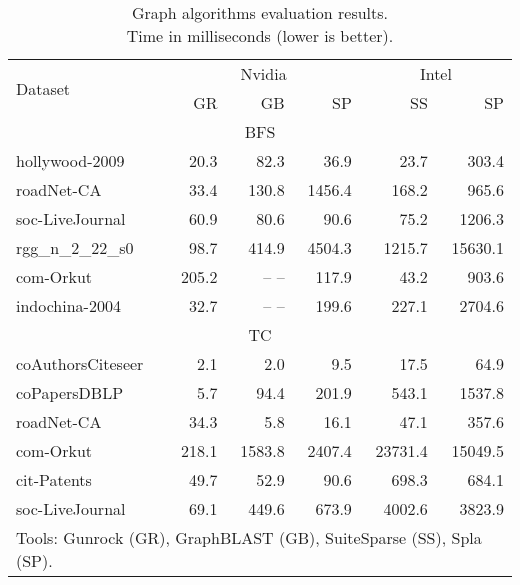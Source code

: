 \begin{table}[htbp]
\caption{Graph algorithms evaluation results.\\Time in milliseconds (lower is better).} 
\begin{center}
    \begin{tabular}{|l|r|r|r|r|r|}
    \hline
    \multirow{2}{*}{Dataset} & \multicolumn{3}{c|}{Nvidia} & \multicolumn{2}{c|}{Intel} \\
    \cline{2-6}
    & GR & GB & SP & SS & SP \\
    \hline
    \hline
    \multicolumn{6}{|c|}{BFS} \\
    \hline
    \rowcolor{black!10} hollywood-2009    &  20.3 &  82.3 &   36.9 &   23.7 &   303.4 \\
    \rowcolor{black!2 } roadNet-CA        &  33.4 & 130.8 & 1456.4 &  168.2 &   965.6 \\
    \rowcolor{black!10} soc-LiveJournal   &  60.9 &  80.6 &   90.6 &   75.2 &  1206.3 \\
    \rowcolor{black!2 } rgg\_n\_2\_22\_s0 &  98.7 & 414.9 & 4504.3 & 1215.7 & 15630.1 \\
    \rowcolor{black!10} com-Orkut         & 205.2 & -- -- &  117.9 &   43.2 &   903.6 \\
    \rowcolor{black!2 } indochina-2004    &  32.7 & -- -- &  199.6 &  227.1 &  2704.6 \\
    \hline
    \hline
    \multicolumn{6}{|c|}{TC} \\
    \hline
    \rowcolor{black!10} coAuthorsCiteseer &   2.1 &    2.0 &    9.5 &    17.5 &    64.9 \\
    \rowcolor{black!2 } coPapersDBLP      &   5.7 &   94.4 &  201.9 &   543.1 &  1537.8 \\
    \rowcolor{black!10} roadNet-CA        &  34.3 &    5.8 &   16.1 &    47.1 &   357.6 \\
    \rowcolor{black!2 } com-Orkut         & 218.1 & 1583.8 & 2407.4 & 23731.4 & 15049.5 \\
    \rowcolor{black!10} cit-Patents       &  49.7 &   52.9 &   90.6 &   698.3 &   684.1 \\
    \rowcolor{black!2 } soc-LiveJournal   &  69.1 &  449.6 &  673.9 &  4002.6 &  3823.9 \\
    \hline
    \hline
    \multicolumn{6}{l}{Tools: Gunrock (GR), GraphBLAST (GB), SuiteSparse (SS), Spla (SP).} \\
    \end{tabular}
    \label{results}
\end{center}
\end{table}
 
